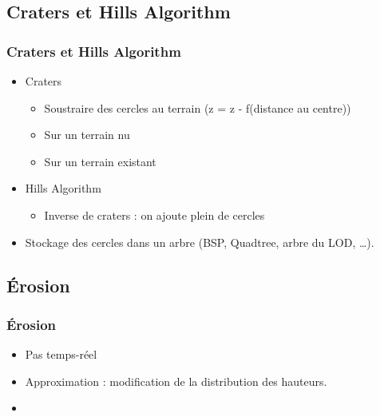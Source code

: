 \documentclass{beamer}
\begin{document}
\subsection{Craters et Hills Algorithm}
\begin{frame}
  \frametitle{Craters et Hills Algorithm}
  \begin{itemize}
  \item Craters
    \begin{itemize}
    \item Soustraire des cercles au terrain (z = z - f(distance au centre))
    \item Sur un terrain nu
    \item Sur un terrain existant
    \end{itemize}
  \item Hills Algorithm
    \begin{itemize}
    \item Inverse de craters : on ajoute plein de cercles
    \end{itemize}
  \item Stockage des cercles dans un arbre (BSP, Quadtree, arbre du LOD, \dots).
  \end{itemize}
\end{frame}

\subsection{Érosion}

\begin{frame}
  \frametitle{Érosion}
  \begin{itemize}
  \item Pas temps-réel
  \item Approximation : modification de la distribution des hauteurs.
  \item 
  \end{itemize}
\end{frame}




\end{document}
